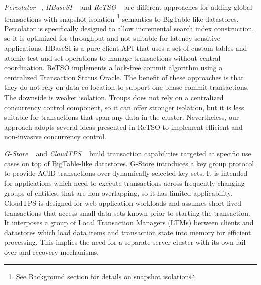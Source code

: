 \documentclass[10pt,final,journal]{IEEEtran}
\begin{document}
\emph{Percolator} ~\cite{Peng:2010:LIP:1924943.1924961}, \emph{HBaseSI} ~\cite{Zhang:2010:5697970} and \emph{ReTSO} ~\cite{Junqueira:2011:LTS:2056318.2057148} are different approaches for adding global transactions with snapshot isolation \footnote{See Background section for details on snapshot isolation} semantics to BigTable-like datastores. Percolator is specifically designed to allow incremental search index construction, so it is optimized for throughput and not suitable for latency-sensitive applications. HBaseSI is a pure client API that uses a set of custom tables and atomic test-and-set operations to manage transactions without central coordination. ReTSO implements a lock-free commit algorithm using a centralized Transaction Status Oracle. The benefit of these approaches is that they do not rely on data co-location to support one-phase commit transactions. The downside is weaker isolation. Troups does not rely on a centralized concurrency control component, so it can offer stronger isolation, but it is less suitable for transactions that span any data in the cluster. Nevertheless, our approach adopts several ideas presented in ReTSO to implement efficient and non-invasive concurrency control.

\emph{G-Store} ~\cite{Das:2010:GSD:1807128.1807157} and \emph{CloudTPS} ~\cite{Wei:2011:5740834} build transaction capabilities targeted at specific use cases on top of BigTable-like datastores. G-Store introduces a key group protocol to provide ACID transactions over dynamically selected key sets. It is intended for applications which need to execute transactions across frequently changing groups of entities, that are non-overlapping, so it has limited applicability. CloudTPS is designed for web application workloads and assumes short-lived transactions that access small data sets known prior to starting the transaction. It interposes a group of Local Transaction Managers (LTMs) between clients and datastores which load data items and transaction state into memory for efficient processing. This implies the need for a separate server cluster with its own fail-over and recovery mechanisms.
\end{document}

